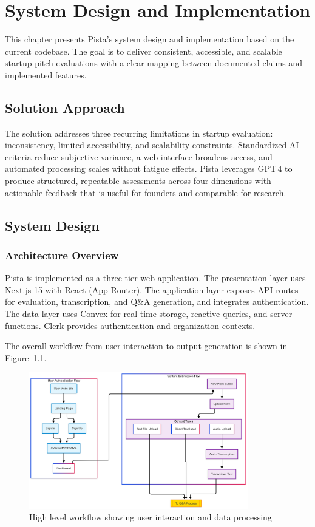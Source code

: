 \chapter{System Design and Implementation} \label{ch:problem-solution}

This chapter presents Pista's system design and implementation based on the current codebase. The goal is to deliver consistent, accessible, and scalable startup pitch evaluations with a clear mapping between documented claims and implemented features.

\section{Solution Approach} \label{sec:solution-approach}

The solution addresses three recurring limitations in startup evaluation: inconsistency, limited accessibility, and scalability constraints. Standardized AI criteria reduce subjective variance, a web interface broadens access, and automated processing scales without fatigue effects. Pista leverages GPT\,4 to produce structured, repeatable assessments across four dimensions with actionable feedback that is useful for founders and comparable for research.

\section{System Design} \label{sec:system-design}

\subsection{Architecture Overview}\label{subsec:architecture-overview}
Pista is implemented as a three tier web application. The presentation layer uses Next.js 15 with React (App Router). The application layer exposes API routes for evaluation, transcription, and Q\&A generation, and integrates authentication. The data layer uses Convex for real time storage, reactive queries, and server functions. Clerk provides authentication and organization contexts.

The overall workflow from user interaction to output generation is shown in Figure~\ref{fig:user-flow}.

\begin{figure}[H]
  \centering
  \includegraphics[width=0.85\textwidth]{img/user-diagram-flow}
  \caption{High level workflow showing user interaction and data processing}
  \label{fig:user-flow}
\end{figure}

